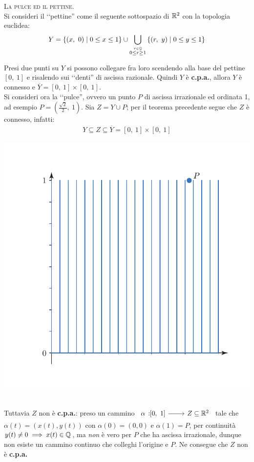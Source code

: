 \begin{example}\textsc{La pulce ed il pettine.}\\
	Si consideri il ‘‘pettine'' come il seguente sottospazio di $\mathbb{R} ^2$ con la topologia euclidea:
		\begin{equation*}
			Y= \left\{ (x,\ 0) \mid 0\leq x\leq 1 \right\} \cup \bigcup_{\stackrel{r\in\mathbb{Q}}{ 0\leq r\geq 1}} \left\{ (r,\ y) \mid 0\leq y \leq 1 \right\}
		\end{equation*}
\begin{minipage}{0.62\textwidth}
Presi due punti su $Y$ si possono collegare fra loro scendendo alla base del pettine $\left[0,\ 1\right]$ e risalendo sui ‘‘denti'' di ascissa razionale. Quindi $Y$ è \textbf{c.p.a.}, allora $Y$ è connesso e $\overline{Y}=\left[0,\ 1\right]\times \left[0,\ 1\right]$.\\
Si consideri ora la ‘‘pulce'', ovvero un punto $P$ di ascissa irrazionale ed ordinata 1, ad esempio $P=\left(\frac{\sqrt{2}}{2},\ 1\right)$. Sia $Z=Y\cup P$; per il teorema precedente segue che $Z$ è connesso, infatti:
\begin{gather*}
	Y\subseteq Z \subseteq \overline{Y}=\left[0,\ 1\right]\times \left[0,\ 1\right]	
\end{gather*}
	\end{minipage}
	\begin{minipage}{0.37\textwidth}
		\includegraphics[trim=1.1cm 0.5cm 0.5cm 1.25cm,clip,scale=0.50]{images/comb.pdf}
	\end{minipage}\\
Tuttavia $Z$ non è \textbf{c.p.a.}: preso un cammino $\funz \alpha {\left[0,\ 1\right]} {Z\subseteq \realset^2}$ tale che $\alpha(t)= \left( x(t), y(t)\right)$ con $\alpha (0)=(0,0)$ e $\alpha(1)=P$, per continuità $y(t)\neq 0 \implies x(t)\in\mathbb{Q}$, ma \textit{non} è vero per $P$ che ha ascissa irrazionale, dunque non esiste un cammino continuo che colleghi l'origine e $P$. Ne consegue che $Z$ non è \textbf{c.p.a.}
\end{example}

